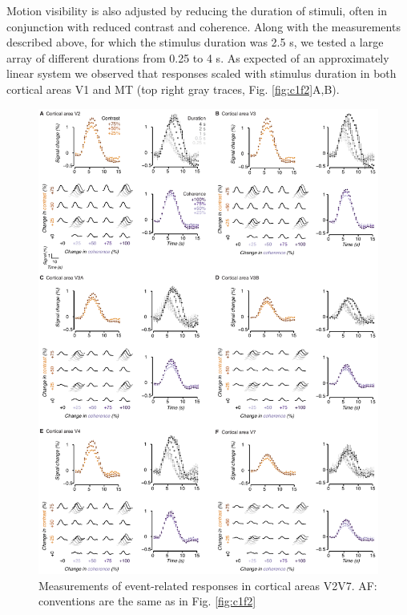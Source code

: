 \documentclass{report}
\begin{document}
Motion visibility is also adjusted by reducing the duration of stimuli, often in conjunction with reduced contrast and coherence. Along with the measurements described above, for which the stimulus duration was 2.5 s, we tested a large array of different durations from 0.25 to 4 s. As expected of an approximately linear system \citep{Boynton2012-xy} we observed that responses scaled with stimulus duration in both cortical areas V1 and MT (top right gray traces, Fig. \ref{fig:c1f2}A,B).

\begin{figure}
\centering
\includegraphics[keepaspectratio,width=\textwidth]{figs_c1/Fig3_v2v7.pdf}
\caption[Measurements of event-related responses in cortical areas V2\textemdash V7]{Measurements of event-related responses in cortical areas V2\textemdash V7. A\textemdash F: conventions are the same as in Fig. \ref{fig:c1f2}}
\label{fig:c1f3}
\end{figure}
\end{document}
